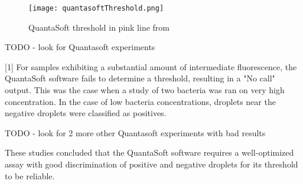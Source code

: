 \begin{figure}[h]
    \centering
    \texttt{[image: quantasoftThreshold.png]}
    \caption[QuantaSoft threshold from a study]{QuantaSoft threshold in pink line from \cite{hussainThreshold}}
        \label{fig:demoQuantThreshold}
\end{figure}


TODO - look for Quantasoft experiments


[1]
For samples exhibiting a substantial amount of intermediate fluorescence, the QuantaSoft software fails to determine a threshold, resulting in a "No call" output. This was the case when a study of two bacteria \cite{Dreo2014} was ran on very high concentration. In the case of low bacteria concentrations, droplets near the negative droplets were classified as positives. 

TODO - look for 2 more other Quantasoft experiments with bad results


These studies concluded that the QuantaSoft software requires a well-optimized assay with good discrimination of positive and negative droplets for its threshold to be reliable.


